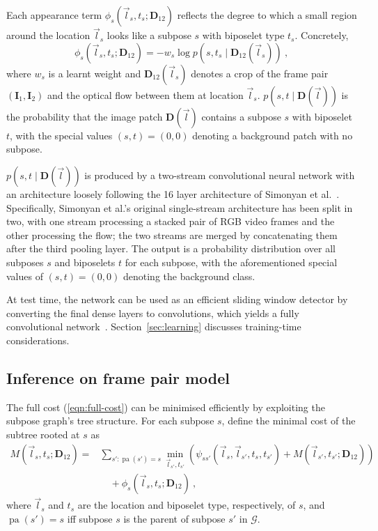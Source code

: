 \documentclass[runningheads]{llncs}
\newcommand{\mat}{\mathbf}
\DeclareMathOperator{\pa}{pa}
\begin{document}
Each appearance term $\phi_s(\vec l_s, t_s; \mat D_{12})$ reflects the degree to
which a small region around the location $\vec l_s$ looks like a subpose $s$
with biposelet type $t_s$. Concretely,
\begin{equation}\label{eqn:unary-cost}
\phi_s(\vec l_s, t_s; \mat D_{12}) = -w_s \log p(s, t_s \mid \mat D_{12}(
\vec l_s))~,
\end{equation}
%
where $w_s$ is a learnt weight and $\mat D_{12}(\vec l_s)$ denotes a crop of the
frame pair $(\mat I_1, \mat I_2)$ and the optical flow between them at location
$\vec l_s$. $p(s, t \mid \mat D(\vec l))$ is the probability that the image
patch $\mat D(\vec l)$ contains a subpose $s$ with biposelet $t$, with the
special values $(s, t) = (0, 0)$ denoting a background patch with no subpose.

$p(s, t \mid \mat D(\vec l))$ is produced by a two-stream convolutional neural
network with an architecture loosely following the 16 layer architecture of
Simonyan et al.~\cite{simonyan2014very}. Specifically, Simonyan et al.'s
original single-stream architecture has been split in two, with one stream
processing a stacked pair of RGB video frames and the other processing the flow;
the two streams are merged by concatenating them after the third pooling layer.
The output is a probability distribution over all subposes $s$ and biposelets
$t$ for each subpose, with the aforementioned special values of $(s, t) = (0,
0)$ denoting the background class.

At test time, the network can be used as an efficient sliding window detector by
converting the final dense layers to convolutions, which yields a fully
convolutional network~\cite{sermanet2013overfeat}. Section~\ref{sec:learning}
discusses training-time considerations.

\subsection{Inference on frame pair model}

The full cost (\ref{eqn:full-cost}) can be minimised efficiently by exploiting
the subpose graph's tree structure. For each subpose $s$, define the minimal
cost of the subtree rooted at $s$ as
%
\begin{equation}\label{eqn:reccost}
\begin{split}
M(\vec l_s, t_s; \mat D_{12}) =
&\sum_{s' : \pa(s') = s} \min_{\vec l_{s'}, t_{s'}} \left(\psi_{s s'}(\vec l_s,
\vec l_{s'}, t_s, t_{s'}) + M(\vec l_{s'}, t_{s'}; \mat D_{12})\right)
\\&\quad+ \phi_s(\vec l_s, t_s; \mat D_{12})~,
\end{split}
\end{equation}
%
where $\vec l_s$ and $t_s$ are the location and biposelet type, respectively, of
$s$, and $\pa(s') = s$ iff subpose $s$ is the parent of subpose $s'$ in
$\mathcal G$.
\end{document}
